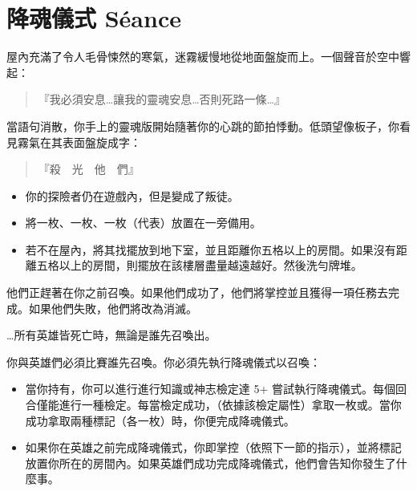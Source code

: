 
\chapter{降魂儀式 Séance}

\begin{HauntStory}
	屋內充滿了令人毛骨悚然的寒氣，迷霧緩慢地從地面盤旋而上。一個聲音於空中響起：

	\begin{quote}
		『我必須安息…讓我的靈魂安息…否則死路一條…』
	\end{quote}

	當語句消散，你手上的靈魂版開始隨著你的心跳的節拍悸動。低頭望像板子，你看見霧氣在其表面盤旋成字：

	\begin{quote}
		『殺　光　他　們』
	\end{quote}
\end{HauntStory}

\vspace*{-1em}
\begin{itemize}
	\item 你的探險者仍在遊戲內，但是變成了叛徒。
	\item 將一枚、一枚、一枚（代表）放置在一旁備用。
	\item 若不在屋內，將其找擺放到地下室，並且距離你五格以上的房間。如果沒有距離五格以上的房間，則擺放在該樓層盡量越遠越好。然後洗勻牌堆。
\end{itemize}

他們正趕著在你之前召喚。如果他們成功了，他們將掌控並且獲得一項任務去完成。如果他們失敗，他們將改為消滅。

…所有英雄皆死亡時，無論是誰先召喚出。

你與英雄們必須比賽誰先召喚。你必須先執行降魂儀式以召喚：
\begin{itemize}
	\item 當你持有，你可以進行進行知識或神志檢定達 5+ 嘗試執行降魂儀式。每個回合僅能進行一種檢定。每當檢定成功，（依據該檢定屬性）拿取一枚或。當你成功拿取兩種標記（各一枚）時，你便完成降魂儀式。
	\item 如果你在英雄之前完成降魂儀式，你即掌控（依照下一節的指示），並將標記放置你所在的房間內。如果英雄們成功完成降魂儀式，他們會告知你發生了什麼事。
\end{itemize}

